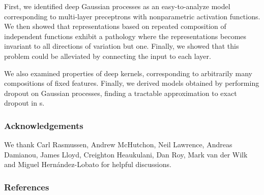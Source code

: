 \documentclass[twoside]{article}
\makeatletter
\newlength{\nonHumbleHeight}
\def\@humbleformat#1{{\settoheight{\nonHumbleHeight}{#1}\resizebox{!}{0.94\nonHumbleHeight}{#1}}}%
\newcommand\humble[1]{{\@humbleformat{#1}}}%
\newcommand{\gp}{{\humble{GP}}}
\newcommand{\MLP}{{\humble{MLP}}}
\makeatother
\begin{document}
First, we identified deep Gaussian processes as an easy-to-analyze model corresponding to multi-layer preceptrons with nonparametric activation functions.
%
We then showed that representations based on repeated composition of independent functions exhibit a pathology where the representations becomes invariant to all directions of variation but one. %
Finally, we showed that this problem could be alleviated by connecting the input to each layer.

We also examined properties of deep kernels, corresponding to arbitrarily many compositions of fixed features.
Finally, we derived models obtained by performing dropout on Gaussian processes, finding a tractable approximation to exact dropout in \gp{}s.


\subsubsection*{Acknowledgements}
We thank Carl Rasmussen, Andrew McHutchon, Neil Lawrence, Andreas Damianou, James Lloyd, Creighton Heaukulani, Dan Roy, Mark van der Wilk and Miguel Hern\'{a}ndez-Lobato for helpful discussions.

\subsubsection*{References}
\vspace{-0.3in}
\renewcommand{\refname}{}



\end{document}
